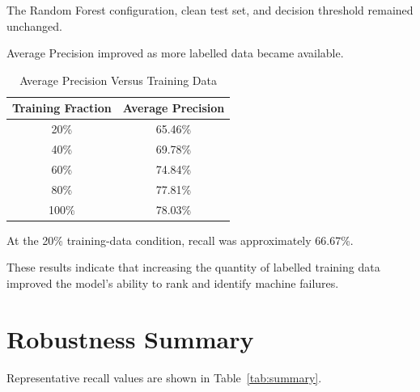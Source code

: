 \documentclass[conference]{IEEEtran}
\begin{document}
The Random Forest configuration, clean test set, and decision threshold remained unchanged.

Average Precision improved as more labelled data became available.

\begin{table}[htbp]

\caption{Average Precision Versus Training Data}

\centering

\begin{tabular}{cc}

\toprule

\textbf{Training Fraction} &
\textbf{Average Precision}\\

\midrule

20\% & 65.46\%\\
40\% & 69.78\%\\
60\% & 74.84\%\\
80\% & 77.81\%\\
100\% & 78.03\%\\

\bottomrule

\end{tabular}

\end{table}

At the 20\% training-data condition, recall was approximately 66.67\%.

These results indicate that increasing the quantity of labelled training data improved the model's ability to rank and identify machine failures.


\section{Robustness Summary}

Representative recall values are shown in Table~\ref{tab:summary}.
\end{document}
